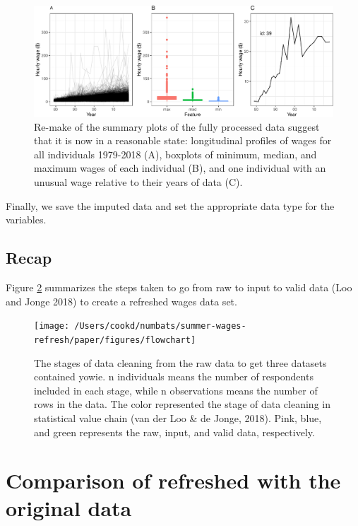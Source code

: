 \documentclass[12pt]{article}
\begin{document}
\begin{figure}

{\centering \includegraphics[width=1\linewidth]{figures/fixed-feature-plot-1} 

}

\caption{Re-make of the summary plots of the fully processed data suggest that it is now in a reasonable state: longitudinal profiles of wages for all individuals 1979-2018 (A), boxplots of minimum, median, and maximum wages of each individual (B), and one individual with an unusual wage relative to their years of data (C). }\label{fig:fixed-feature-plot}
\end{figure}

Finally, we save the imputed data and set the appropriate data type for the variables.

\hypertarget{recap}{%
\subsection{Recap}\label{recap}}

Figure \ref{fig:flow-chart} summarizes the steps taken to go from raw to input to valid data (Loo and Jonge 2018) to create a refreshed wages data set.

\begin{figure}

{\centering \texttt{[image: /Users/cookd/numbats/summer-wages-refresh/paper/figures/flowchart]} 

}

\caption{The stages of data cleaning from the raw data to get three datasets contained yowie. n individuals means the number of respondents included in each stage, while n observations means the number of rows in the data. The color represented the stage of data cleaning in statistical value chain (van der Loo \& de Jonge, 2018). Pink, blue, and green represents the raw, input, and valid data, respectively.}\label{fig:flow-chart}
\end{figure}

\hypertarget{compare}{%
\section{Comparison of refreshed with the original data}\label{compare}}
\end{document}
